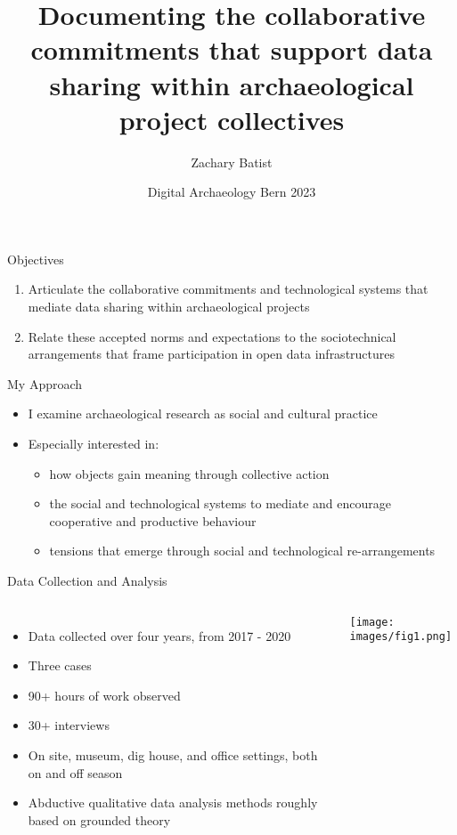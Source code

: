 \documentclass{beamer}
\title{Documenting the collaborative commitments that support data sharing within archaeological project collectives}
\author{Zachary Batist}
\date{Digital Archaeology Bern 2023}
\institute{Faculty of Information \\ University of Toronto}
\begin{document}
\begin{frame}
  \maketitle
\end{frame}

\begin{frame}{Objectives}
  \begin{enumerate}
    \item Articulate the collaborative commitments and technological systems that mediate data sharing within archaeological projects
    \item Relate these accepted norms and expectations to the sociotechnical arrangements that frame participation in open data infrastructures
  \end{enumerate}
\end{frame}

\begin{frame}{My Approach}
  \begin{itemize}
    \item I examine archaeological research as social and cultural practice
    \item Especially interested in:
    \begin{itemize}
      \item how objects gain meaning through collective action
      \item the social and technological systems to mediate and encourage cooperative and productive behaviour
      \item tensions that emerge through social and technological re-arrangements
    \end{itemize}
  \end{itemize}
\end{frame}
  

  \begin{frame}{Data Collection and Analysis}
    \begin{columns}[T,onlytextwidth]
      \begin{itemize}
        \item Data collected over four years, from 2017 - 2020
        \item Three cases
        \item 90+ hours of work observed
        \item 30+ interviews
        \item On site, museum, dig house, and office settings, both on and off season
        \item Abductive qualitative data analysis methods roughly based on grounded theory
      \end{itemize}

    \centering
    \texttt{[image: images/fig1.png]}
  \end{columns}
\end{frame}
\end{document}
